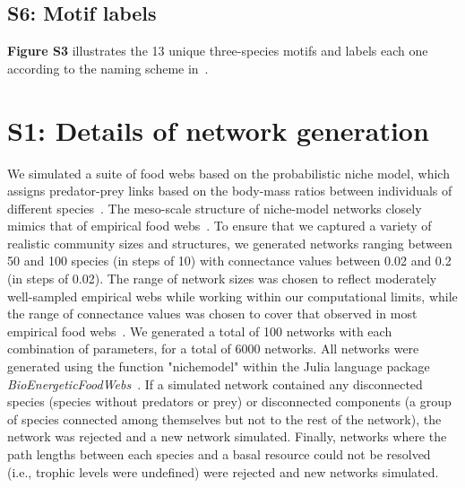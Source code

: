 \documentclass[12pt]{article}
\begin{document}
    \subsection*{S6: Motif labels}
        
        \textbf{Figure S3} illustrates the 13 unique three-species motifs and labels each one according to the naming scheme in~\citet{Stouffer2007}.

\clearpage

\linenumbers
\section*{S1: Details of network generation}


	We simulated a suite of food webs based on the probabilistic niche model, which assigns predator-prey links based on the body-mass ratios between individuals of different species~\citep{Williams2000,Delmas2017}. The meso-scale structure of niche-model networks closely mimics that of empirical food webs~\citep{Stouffer2007}. To ensure that we captured a variety of realistic community sizes and structures, we generated networks ranging between 50 and 100 species (in steps of 10) with connectance values between 0.02 and 0.2 (in steps of 0.02). The range of network sizes was chosen to reflect moderately well-sampled empirical webs while working within our computational limits, while the range of connectance values was chosen to cover that observed in most empirical food webs~\citep{Dunne2002e}. We generated a total of 100 networks with each combination of parameters, for a total of 6000 networks. All networks were generated using the function "nichemodel" within the Julia language package \emph{BioEnergeticFoodWebs}~\citep{bioenergeticfw,Delmas2017}. If a simulated network contained any disconnected species (species without predators or prey) or disconnected components (a group of species connected among themselves but not to the rest of the network), the network was rejected and a new network simulated. Finally, networks where the path lengths between each species and a basal resource could not be resolved (i.e., trophic levels were undefined) were rejected and new networks simulated.
\end{document}
